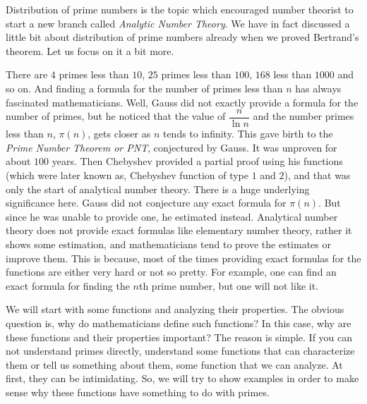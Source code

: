 Distribution of prime numbers is the topic which encouraged number theorist to start a new branch called \textit{Analytic Number Theory}. We have in fact discussed a little bit about distribution of prime numbers already when we proved Bertrand's theorem. Let us focus on it a bit more.

There are $4$ primes less than $10$, $25$ primes less than $100$, $168$ less than $1000$ and so on. And finding a formula for the number of primes less than $n$ has always fascinated mathematicians. Well, Gauss did not exactly provide a formula for the number of primes, but he noticed that the value of $\dfrac{n}{\ln n}$ and the number primes less than $n$, $\pi(n)$, gets closer as $n$ tends to infinity. This gave birth to the \textit{Prime Number Theorem or PNT}, conjectured by Gauss. It was unproven for about $100$ years. Then Chebyshev provided a partial proof using his functions (which were later known as, Chebyshev function of type $1$ and $2$), and that was only the start of analytical number theory. There is a huge underlying significance here. Gauss did not conjecture any exact formula for $\pi(n)$. But since he was unable to provide one, he estimated instead. Analytical number theory does not provide exact formulas like elementary number theory, rather it shows some estimation, and mathematicians tend to prove the estimates or improve them. This is because, most of the times providing exact formulas for the functions are either very hard or not so pretty. For example, one can find an exact formula for finding the $n$th prime number, but one will not like it.

We will start with some functions and analyzing their properties. The obvious question is, why do mathematicians define such functions? In this case, why are these functions and their properties important? The reason is simple. If you can not understand primes directly, understand some functions that can characterize them or tell us something about them, some function that we can analyze. At first, they can be intimidating. So, we will try to show examples in order to make sense why these functions have something to do with primes.

